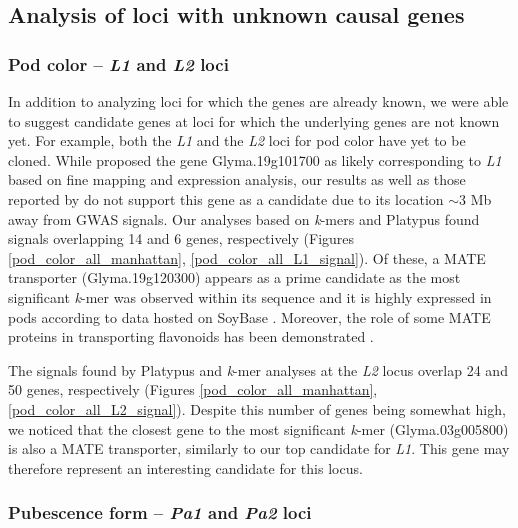 \subsection{Analysis of loci with unknown causal genes}
\label{sv-gwas-results}

\subsubsection{Pod color -- \textit{L1} and \textit{L2} loci}
\label{sv-gwas-main-results-pod-color-l1-l2}

In addition to analyzing loci for which the genes are already known, we were
able to suggest candidate genes at loci for which the underlying genes are not
known yet. For example, both the \textit{L1} and the \textit{L2} loci for pod
color have yet to be cloned. While \cite{he2015} proposed the gene
Glyma.19g101700 as likely corresponding to \textit{L1} based on fine mapping
and expression analysis, our results as well as those reported by
\cite{bandillo2017} do not support this gene as a candidate due to its location
$\sim$3 Mb away from GWAS signals. Our analyses based on
\textit{k}-mers and Platypus found signals overlapping 14 and 6
genes, respectively (Figures \ref{pod_color_all_manhattan},
\ref{pod_color_all_L1_signal}). Of these, a MATE transporter (Glyma.19g120300)
appears as a prime candidate as the most significant \emph{k}-mer was observed
within its sequence and it is highly expressed in pods according to data hosted
on SoyBase \citep{grant2010, severin2010}. Moreover, the role of some MATE
proteins in transporting flavonoids has been demonstrated \citep{chen2015}.

The signals found by Platypus and \emph{k}-mer analyses at the \textit{L2}
locus overlap 24 and 50 genes, respectively (Figures
\ref{pod_color_all_manhattan}, \ref{pod_color_all_L2_signal}). Despite this
number of genes being somewhat high, we noticed that the closest gene to the
most significant \emph{k}-mer (Glyma.03g005800) is also a MATE transporter,
similarly to our top candidate for \emph{L1}. This gene may therefore represent
an interesting candidate for this locus.

\subsubsection{Pubescence form -- \textit{Pa1} and \textit{Pa2} loci}
\label{sv-gwas-main-results-pubescence-form-pa1-pa2}

